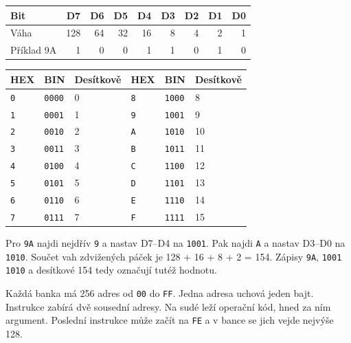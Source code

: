 \documentclass[11pt,a4paper]{article}
\newcommand{\sub}[1]{\par\vspace{2mm}{\sffamily\bfseries\large #1\par}\nobreak}
\begin{document}
{\small\begin{tabularx}{\linewidth}{@{}Xrrrrrrrr@{}}\toprule
\textbf{Bit} & \textbf{D7} & \textbf{D6} & \textbf{D5} & \textbf{D4} & \textbf{D3} & \textbf{D2} & \textbf{D1} & \textbf{D0}\\\midrule
Váha & 128 & 64 & 32 & 16 & 8 & 4 & 2 & 1\\
Příklad 9A & 1 & 0 & 0 & 1 & 1 & 0 & 1 & 0\\
\bottomrule\end{tabularx}}\par
\sub{Jedna číslice HEX odpovídá čtyřem páčkám}
{\small\begin{tabularx}{\linewidth}{@{}llXllX@{}}\toprule
\textbf{HEX} & \textbf{BIN} & \textbf{Desítkově} & \textbf{HEX} & \textbf{BIN} & \textbf{Desítkově}\\\midrule
\texttt{0} & \texttt{0000} & 0 & \texttt{8} & \texttt{1000} & 8\\
\texttt{1} & \texttt{0001} & 1 & \texttt{9} & \texttt{1001} & 9\\
\texttt{2} & \texttt{0010} & 2 & \texttt{A} & \texttt{1010} & 10\\
\texttt{3} & \texttt{0011} & 3 & \texttt{B} & \texttt{1011} & 11\\
\texttt{4} & \texttt{0100} & 4 & \texttt{C} & \texttt{1100} & 12\\
\texttt{5} & \texttt{0101} & 5 & \texttt{D} & \texttt{1101} & 13\\
\texttt{6} & \texttt{0110} & 6 & \texttt{E} & \texttt{1110} & 14\\
\texttt{7} & \texttt{0111} & 7 & \texttt{F} & \texttt{1111} & 15\\
\bottomrule\end{tabularx}}\par
Pro \texttt{9A} najdi nejdřív \texttt{9} a nastav D7--D4 na \texttt{1001}. Pak najdi \texttt{A} a nastav D3--D0 na \texttt{1010}. Součet vah zdvižených páček je 128 + 16 + 8 + 2 = 154. Zápisy \texttt{9A}, \texttt{1001 1010} a desítkové 154 tedy označují tutéž hodnotu.

\sub{Adresa a obsah}
Každá banka má 256 adres od \texttt{00} do \texttt{FF}. Jedna adresa uchová jeden bajt. Instrukce zabírá dvě sousední adresy. Na sudé leží operační kód, hned za ním argument. Poslední instrukce může začít na \texttt{FE} a v bance se jich vejde nejvýše 128.
\end{document}
